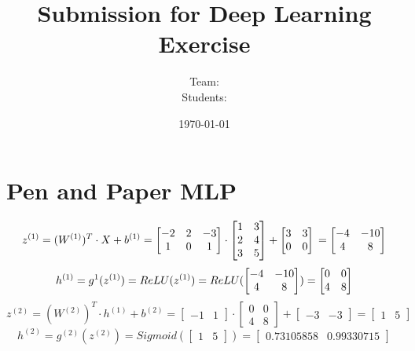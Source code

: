 \documentclass[addpoints]{exam}
\title{Submission for Deep Learning Exercise \assignmentnumber}
\author{Team: \teamname\\Students: \students}
\date{\today}
\begin{document}
    \maketitle


    \section{Pen and Paper MLP}
	\begin{equation}
			z^{(1)} = (W^{(1)})^T\cdot X + b^{(1)} \\
	= \begin{bmatrix}
				-2 &2 &-3  \\
				1& 0 &1 
			\end{bmatrix} \cdot\begin{bmatrix}
				1 &3  \\
				2& 4 \\
				3& 5
			\end{bmatrix} + \begin{bmatrix}
				3 &3  \\
				0& 0
			\end{bmatrix}\\
		= \begin{bmatrix}
			-4 &-10  \\
			4 &8 
		\end{bmatrix}
	\end{equation}
\begin{equation}
	h^{(1)} = g^{1}(z^{(1)}) \\
	= ReLU(z^{(1)})  = ReLU(\begin{bmatrix}
		-4 &-10  \\
		4 &8 
	\end{bmatrix}) = \begin{bmatrix}
	0&0 \\
	4 &8 
\end{bmatrix}
\end{equation}
\begin{equation}
	z^{(2)} = (W^{(2)})^{T}\cdot 	h^{(1)} +b^{(2)} = \begin{bmatrix}
		-1 &1 
	\end{bmatrix} \cdot \begin{bmatrix}
	0 & 0 \\
	4 & 8
\end{bmatrix} + \begin{bmatrix}
-3 & -3 
\end{bmatrix} = \begin{bmatrix}
1 & 5 
\end{bmatrix}
\end{equation}
\begin{equation}
	h^{(2)} = g^{(2)}(z^{(2)}) = Sigmoid(\begin{bmatrix}
		1 & 5 
	\end{bmatrix}) = \begin{bmatrix}
	0.73105858 &  0.99330715
	
\end{bmatrix}
\end{equation}
\end{document}
